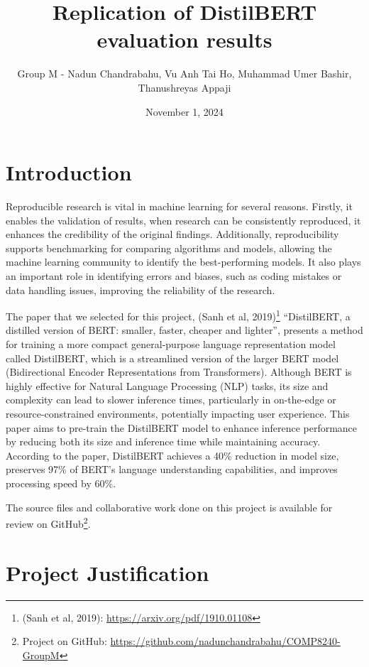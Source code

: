 \documentclass[
  11pt,
]{article}
\title{Replication of DistilBERT evaluation results}
\author{Group M - Nadun Chandrabahu, Vu Anh Tai Ho, Muhammad Umer
Bashir, Thanushreyas Appaji}
\date{November 1, 2024}
\begin{document}
\maketitle

\section{Introduction}\label{introduction}

Reproducible research is vital in machine learning for several reasons.
Firstly, it enables the validation of results, when research can be
consistently reproduced, it enhances the credibility of the original
findings. Additionally, reproducibility supports benchmarking for
comparing algorithms and models, allowing the machine learning community
to identify the best-performing models. It also plays an important role
in identifying errors and biases, such as coding mistakes or data
handling issues, improving the reliability of the research.

The paper that we selected for this project, (Sanh et al,
2019)\footnote{(Sanh et al, 2019):
  \url{https://arxiv.org/pdf/1910.01108}} ``DistilBERT, a distilled
version of BERT: smaller, faster, cheaper and lighter'', presents a
method for training a more compact general-purpose language
representation model called DistilBERT, which is a streamlined version
of the larger BERT model (Bidirectional Encoder Representations from
Transformers). Although BERT is highly effective for Natural Language
Processing (NLP) tasks, its size and complexity can lead to slower
inference times, particularly in on-the-edge or resource-constrained
environments, potentially impacting user experience. This paper aims to
pre-train the DistilBERT model to enhance inference performance by
reducing both its size and inference time while maintaining accuracy.
According to the paper, DistilBERT achieves a 40\% reduction in model
size, preserves 97\% of BERT's language understanding capabilities, and
improves processing speed by 60\%.

The source files and collaborative work done on this project is
available for review on GitHub\footnote{Project on GitHub:
  \url{https://github.com/nadunchandrabahu/COMP8240-GroupM}}.

\section{Project Justification}\label{project-justification}
\end{document}
